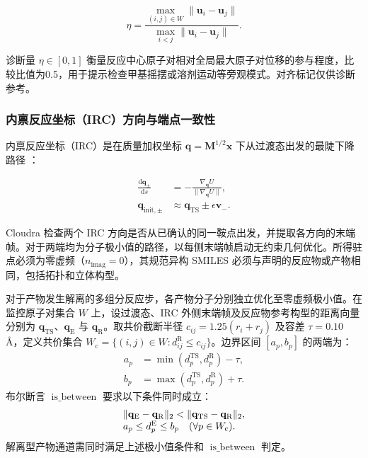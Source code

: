 \begin{equation}\label{eq:methods-11}
\eta=\frac{\max_{(i,j)\in W}\|\mathbf{u}_i-\mathbf{u}_j\|}{\max_{i<j}\|\mathbf{u}_i-\mathbf{u}_j\|}.
\end{equation}

诊断量 $\eta\in[0,1]$ 衡量反应中心原子对相对全局最大原子对位移的参与程度，比较比值为0.5，用于提示检查甲基摇摆或溶剂运动等旁观模式。对齐标记仅供诊断参考。

\subsubsection{内禀反应坐标（IRC）方向与端点一致性}
内禀反应坐标（IRC）是在质量加权坐标 $\mathbf{q}=\mathbf{M}^{1/2}\mathbf{x}$ 下从过渡态出发的最陡下降路径 \citep{ref09,ref10}：

\begin{equation}\label{eq:methods-12}
\begin{aligned}
\frac{\mathrm{d}\mathbf{q}_{\pm}}{\mathrm{d}s}&=-\frac{\nabla_{\mathbf{q}}U}{\|\nabla_{\mathbf{q}}U\|},\\
\mathbf{q}_{\mathrm{init},\pm}&\approx\mathbf{q}_{\mathrm{TS}}\pm\epsilon\mathbf{v}_-.
\end{aligned}
\end{equation}

Cloudra 检查两个 IRC 方向是否从已确认的同一鞍点出发，并提取各方向的末端帧。对于两端均为分子极小值的路径，以每侧末端帧启动无约束几何优化。所得驻点必须为零虚频（$n_{\mathrm{imag}}=0$），其规范异构 SMILES 必须与声明的反应物或产物相同，包括拓扑和立体构型。

对于产物发生解离的多组分反应步，各产物分子分别独立优化至零虚频极小值。在监控原子对集合 $W$ 上，设过渡态、IRC 外侧末端帧及反应物参考构型的距离向量分别为 $\mathbf{q}_{\mathrm{TS}}$、$\mathbf{q}_{\mathrm{E}}$ 与 $\mathbf{q}_{\mathrm{R}}$。取共价截断半径 $c_{ij}=1.25(r_i+r_j)$ 及容差 $\tau=0.10$ Å，定义共价集合 $W_{\mathrm{c}}=\{(i,j)\in W:d_{ij}^{\mathrm{R}}\le c_{ij}\}$。边界区间 $[a_p,b_p]$ 的两端为：
\[
\begin{aligned}
a_p&=\min(d_p^{\mathrm{TS}},d_p^{\mathrm{R}})-\tau,\\
b_p&=\max(d_p^{\mathrm{TS}},d_p^{\mathrm{R}})+\tau.
\end{aligned}
\]
布尔断言 $\operatorname{is\_between}$ 要求以下条件同时成立：
\[
\begin{array}{@{}l@{}}
\|\mathbf{q}_{\mathrm{E}}-\mathbf{q}_{\mathrm{R}}\|_2
<\|\mathbf{q}_{\mathrm{TS}}-\mathbf{q}_{\mathrm{R}}\|_2,\\
a_p\le d_p^{\mathrm{E}}\le b_p
\quad(\forall p\in W_{\mathrm{c}}).
\end{array}
\]
解离型产物通道需同时满足上述极小值条件和 $\operatorname{is\_between}$ 判定。

